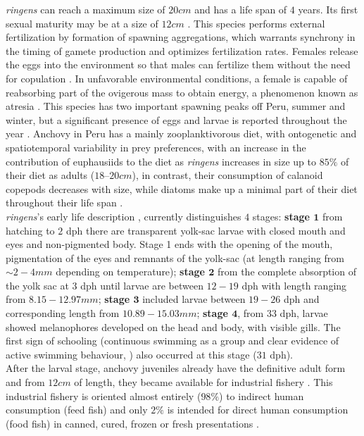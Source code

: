 \textit{\gls{ringens}} can reach a maximum size of $20cm$ and has a life span of $4$ years. Its first sexual maturity may be at a size of $12cm$ \citep{GutiSwar2007,MarzShin2009}. This species performs external fertilization by formation of spawning aggregations, which warrants synchrony in the timing of gamete production and optimizes fertilization rates. Females release the eggs into the environment so that males can fertilize them without the need for copulation \citep{Gani2014}. In unfavorable environmental conditions, a female is capable of reabsorbing part of the ovigerous mass to obtain energy, a phenomenon known as atresia \citep{PereRoqu2008,EspiVera2009,ClarCast2012,BuitPere2018}. This species has two important spawning peaks off Peru, summer and winter, but a significant presence of eggs and larvae is reported throughout the year \citep{MarzShin2009}. Anchovy in Peru has a mainly zooplanktivorous diet, with ontogenetic and spatiotemporal variability in prey preferences, with an increase in the contribution of euphausiids to the diet as \textit{\gls{ringens}} increases in size up to $85 \%$ of their diet as adults ($18 – 20 cm$), in contrast, their consumption of calanoid copepods decreases with size, while diatoms make up a minimal part of their diet throughout their life span \citep{EspiBert2008,EspiBert2014}.\\

\textit{\gls{ringens}}’s early life description \citep{RiouOfel2021}, currently distinguishes $4$ stages: \textbf{stage $\mathbf{1}$} from hatching to $2$ \acrfull{dph} there are transparent yolk-sac larvae with closed mouth and eyes and non-pigmented body. Stage 1 ends with the opening of the mouth, pigmentation of the eyes and remnants of the yolk-sac (at length ranging from $\sim 2-4 mm$ depending on temperature); \textbf{stage $\mathbf{2}$} from the complete absorption of the yolk sac at $3$ \acrshort{dph} until larvae are between $12-19$ \acrshort{dph} with length ranging from $8.15-12.97mm$; \textbf{stage $\mathbf{3}$} included larvae between $19-26$ \acrshort{dph} and corresponding length from $10.89-15.03mm$; \textbf{stage $\mathbf{4}$}, from $33$ \acrshort{dph}, larvae showed melanophores developed on the head and body, with visible gills. The first sign of schooling (continuous swimming as a group and clear evidence of active swimming behaviour, \cite{Shaw1962}) also occurred at this stage ($31$ \acrshort{dph}).\\

After the larval stage, anchovy juveniles already have the definitive adult form and from $12 cm$ of length, they became available for industrial fishery \citep{MarzShin2009}. This industrial fishery is oriented almost entirely ($98 \%$) to indirect human consumption (feed fish) and only $2 \%$ is intended for direct human consumption (food fish) in canned, cured, frozen or fresh presentations \citep{FreoSuei2014}.\\

